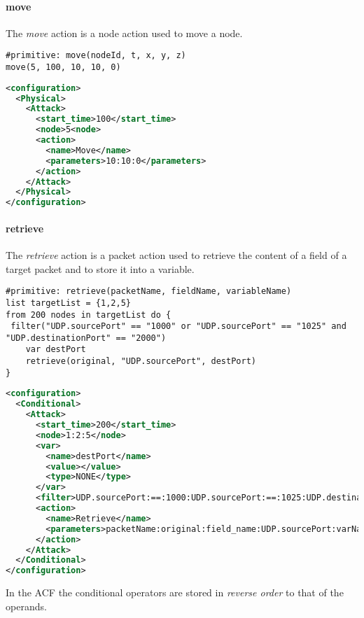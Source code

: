 \paragraph{move}
The \emph{move} action is a node action used to move a node.
%
\begin{lstlisting}[language={asl},caption={ASL move example}]
#primitive: move(nodeId, t, x, y, z)
move(5, 100, 10, 10, 0)
\end{lstlisting}
%
\begin{lstlisting}[language={xml},caption={Interpreter output}]
<configuration>
  <Physical>
    <Attack>
      <start_time>100</start_time>
      <node>5<node>
      <action>
        <name>Move</name>
        <parameters>10:10:0</parameters>
      </action>
    </Attack>
  </Physical>
</configuration>
\end{lstlisting}

\paragraph{retrieve}
The \emph{retrieve} action is a packet action used to retrieve the content of a field of a target packet and to store it into a variable.
%
\begin{lstlisting}[language={asl},caption={ASL retrieve example}]
#primitive: retrieve(packetName, fieldName, variableName)
list targetList = {1,2,5}
from 200 nodes in targetList do {
 filter("UDP.sourcePort" == "1000" or "UDP.sourcePort" == "1025" and "UDP.destinationPort" == "2000")
    var destPort
    retrieve(original, "UDP.sourcePort", destPort)
}
\end{lstlisting}
%
\begin{lstlisting}[language={xml},caption={Interpreter output}]
<configuration>
  <Conditional>
    <Attack>
      <start_time>200</start_time>
      <node>1:2:5</node>
      <var>
        <name>destPort</name>
        <value></value>
        <type>NONE</type>
      </var>
      <filter>UDP.sourcePort:==:1000:UDP.sourcePort:==:1025:UDP.destinationPort:==:2000:AND:OR</filter>
      <action>
        <name>Retrieve</name>
        <parameters>packetName:original:field_name:UDP.sourcePort:varName:destPort</parameters>
      </action>
    </Attack>
  </Conditional>
</configuration>
\end{lstlisting}
%
In the ACF the conditional operators are stored in \emph{reverse order} to that of the operands.

